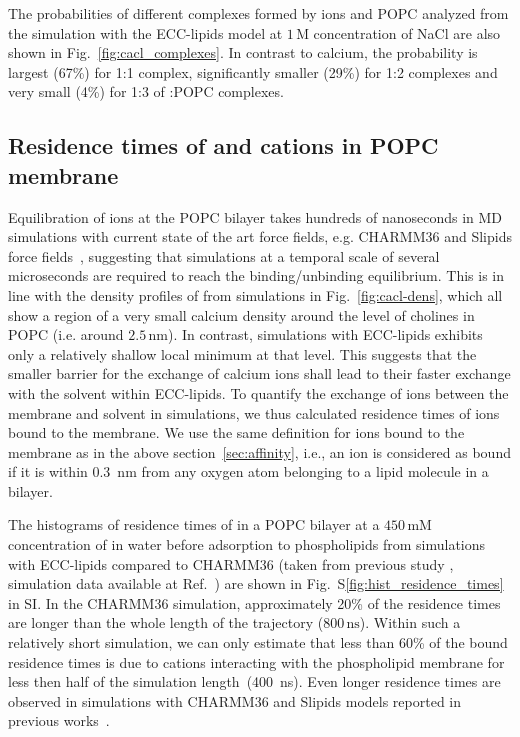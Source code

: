 \documentclass[aip,jcp,twocolumn]{revtex4}
\begin{document}
The probabilities of different complexes formed by  ions and POPC
analyzed from the simulation with the ECC-lipids model at $1\,$M concentration of NaCl are also 
shown in Fig.~\ref{fig:cacl_complexes}. In contrast to calcium, the
probability is largest (67\%) for 1:1 complex, significantly smaller (29\%)
for 1:2 complexes and very small (4\%) for 1:3 of :POPC complexes.




\subsection{Residence times of  and  cations in POPC membrane}

Equilibration of  ions at the POPC bilayer takes hundreds of
nanoseconds in MD simulations with current state of the art force fields,
e.g. CHARMM36 and Slipids force fields~\cite{javanainen17}, suggesting that
simulations at a temporal scale of several microseconds are required
to reach the binding/unbinding equilibrium. 
This is in line with the density profiles of  
from simulations in Fig.~\ref{fig:cacl-dens}, 
which all show a region of a very small calcium density 
around the level of cholines in POPC (i.e. around $2.5\,\mathrm{nm}$).
In contrast, simulations with  ECC-lipids 
exhibits only a relatively shallow local
minimum at that level.
This suggests that the smaller barrier for the exchange of calcium ions 
shall lead to their faster exchange with the solvent within ECC-lipids.
To quantify the exchange of ions between the membrane and solvent in simulations, we thus calculated 
residence times of ions bound to the membrane.
We use the same definition for ions bound to the membrane as in the above section~\ref{sec:affinity},
i.e., an ion is considered as bound if it is within 0.3~nm from any oxygen atom
belonging to a lipid molecule in a bilayer.

The histograms of residence times of  in a POPC bilayer 
at a $450\,\mathrm{mM}$ concentration of  in water before adsorption to phospholipids
from simulations with ECC-lipids 
compared to CHARMM36 (taken from previous study \cite{javanainen17}, 
simulation data available at Ref.~)
are shown in Fig.~S\ref{fig:hist_residence_times} in SI. 
In the CHARMM36 simulation, approximately 20\% of the  residence times are longer than
the whole length of the trajectory ($800\,\mathrm{ns}$).
Within such a relatively short simulation, 
we can only estimate that 
less than 60\% of the bound residence times 
is due to cations interacting with the phospholipid membrane 
for less then half of the simulation length~(400~ns).
Even longer residence times are observed
in  simulations with CHARMM36 and Slipids models reported in previous works~\cite{javanainen17}.
\end{document}
